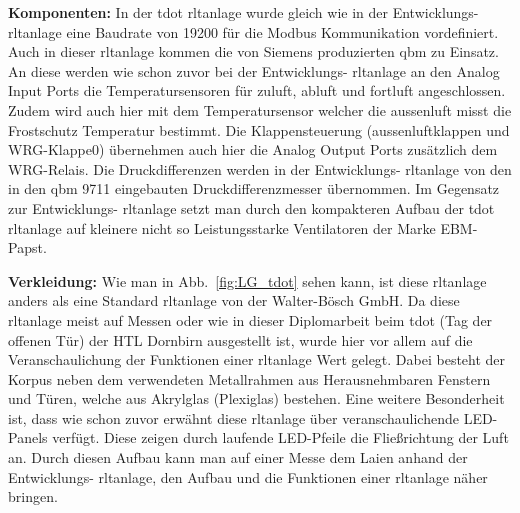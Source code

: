 \textbf{Komponenten:}
In der \gls{tdot} \ac{rltanlage} wurde gleich wie in der Entwicklungs- \ac{rltanlage} eine Baudrate von 19200 für die Modbus Kommunikation vordefiniert. Auch in dieser \ac{rltanlage} kommen die von Siemens produzierten \gls{qbm} zu Einsatz. An diese werden wie schon zuvor bei der Entwicklungs- \ac{rltanlage} an den Analog Input Ports die Temperatursensoren für \gls{zuluft}, \gls{abluft} und \gls{fortluft} angeschlossen. Zudem wird auch hier mit dem Temperatursensor welcher die \gls{aussenluft} misst die Frostschutz Temperatur bestimmt. Die Klappensteuerung (\gls{aussenluft}klappen und WRG-Klappe0) übernehmen auch hier die Analog Output Ports zusätzlich dem WRG-Relais. Die Druckdifferenzen werden in der Entwicklungs- \ac{rltanlage} von den in den \gls{qbm} 9711 eingebauten Druckdifferenzmesser übernommen. Im Gegensatz zur Entwicklungs- \ac{rltanlage} setzt man durch den kompakteren Aufbau der \gls{tdot} \ac{rltanlage} auf kleinere nicht so Leistungsstarke Ventilatoren der Marke EBM-Papst. 


\textbf{Verkleidung:}
Wie man in Abb.~\ref{fig:LG_tdot} sehen kann, ist diese \ac{rltanlage} anders als eine Standard \ac{rltanlage} von der Walter-Bösch GmbH. Da diese \ac{rltanlage} meist auf Messen oder wie in dieser Diplomarbeit beim \gls{tdot} (Tag der offenen Tür) der HTL Dornbirn ausgestellt ist, wurde hier vor allem auf die Veranschaulichung der Funktionen einer \ac{rltanlage} Wert gelegt. Dabei besteht der Korpus neben dem verwendeten Metallrahmen aus Herausnehmbaren Fenstern und Türen, welche aus Akrylglas (Plexiglas) bestehen. Eine weitere Besonderheit ist, dass wie schon zuvor erwähnt diese \ac{rltanlage} über veranschaulichende LED-Panels verfügt. Diese zeigen durch laufende LED-Pfeile die Fließrichtung der Luft an. Durch diesen Aufbau kann man auf \zB einer Messe dem Laien anhand der Entwicklungs- \ac{rltanlage}, den Aufbau und die Funktionen einer \ac{rltanlage} näher bringen.


